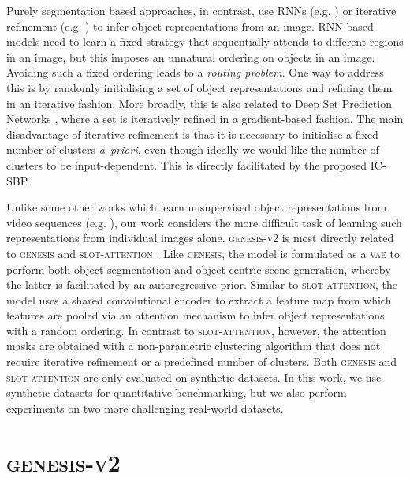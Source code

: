 \documentclass{article}
\begin{document}
Purely segmentation based approaches, in contrast, use RNNs (e.g. \cite{burgess2019monet,engelcke2020genesis}) or iterative refinement (e.g. \cite{greff2016tagger,greff2017neural,van2018relational,greff2019multi,veerapaneni2020entity,locatello2020object}) to infer object representations from an image.
RNN based models need to learn a fixed strategy that sequentially attends to different regions in an image, but this imposes an unnatural ordering on objects in an image.
Avoiding such a fixed ordering leads to a \emph{routing problem}.
One way to address this is by randomly initialising a set of object representations and refining them in an iterative fashion.
More broadly, this is also related to Deep Set Prediction Networks \cite{zhang2019deep}, where a set is iteratively refined in a gradient-based fashion.
The main disadvantage of iterative refinement is that it is necessary to initialise a fixed number of clusters \mbox{\emph{a priori}}, even though ideally we would like the number of clusters to be input-dependent.
This is directly facilitated by the proposed IC-SBP.

Unlike some other works which learn unsupervised object representations from video sequences (e.g. \cite{kosiorek2018sqair,jiang2020scalor}), our work considers the more difficult task of learning such representations from individual images alone.
\textsc{genesis-v2} is most directly related to \textsc{genesis} \cite{engelcke2020genesis} and \textsc{slot-attention} \cite{locatello2020object}.
Like \textsc{genesis}, the model is formulated as a \textsc{vae} to perform both object segmentation and object-centric scene generation, whereby the latter is facilitated by an autoregressive prior.
Similar to \textsc{slot-attention}, the model uses a shared convolutional encoder to extract a feature map from which features are pooled via an attention mechanism to infer object representations with a random ordering.
In contrast to \textsc{slot-attention}, however, the attention masks are obtained with a non-parametric clustering algorithm that does not require iterative refinement or a predefined number of clusters.
Both \textsc{genesis} and \textsc{slot-attention} are only evaluated on synthetic datasets.
In this work, we use synthetic datasets for quantitative benchmarking, but we also perform experiments on two more challenging real-world datasets.


\section{\textsc{genesis-v2}}
\end{document}

